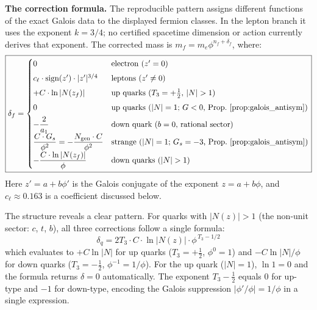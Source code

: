 \documentclass[12pt,a4paper]{article}
\theoremstyle{definition}
\begin{document}
\textbf{The correction formula.}  The reproducible pattern assigns different
functions of the exact Galois data to the displayed fermion classes.  In the
lepton branch it uses the exponent $k=3/4$; no certified spacetime dimension
or action currently derives that exponent.  The corrected mass is
$m_f=m_e\phi^{n_f+\delta_f}$, where:
\begin{equation}
\boxed{\delta_f = \begin{cases}
0 & \text{electron (}z' = 0\text{)} \\[4pt]
c_\ell \cdot \mathrm{sign}(z') \cdot |z'|^{3/4} & \text{leptons (}z' \neq 0\text{)} \\[4pt]
+C \cdot \ln|N(z_f)| & \text{up quarks (}T_3 = +\tfrac{1}{2}\text{, } |N| > 1\text{)} \\[4pt]
0 & \text{up quarks (}|N| = 1\text{; }G < 0\text{, Prop.~\ref{prop:galois_antisym})} \\[4pt]
-\dfrac{2}{a_1} & \text{down quark (}b = 0\text{, rational sector)} \\[4pt]
\dfrac{C \cdot G_s}{\phi^2} = -\dfrac{N_{\text{gen}} \cdot C}{\phi^2} & \text{strange (}|N| = 1\text{; }G_s = -3\text{, Prop.~\ref{prop:galois_antisym})} \\[4pt]
-\dfrac{C \cdot \ln|N(z_f)|}{\phi} & \text{down quarks (}|N| > 1\text{)}
\end{cases}}
\label{eq:normlog}
\end{equation}
Here $z' = a + b\phi'$ is the Galois conjugate of the exponent $z = a + b\phi$, and $c_\ell \approx 0.163$ is a coefficient discussed below.

The structure reveals a clear pattern.  For quarks with $|N(z)| > 1$ (the non-unit sector: $c$, $t$, $b$), all three corrections follow a single formula:
\begin{equation}
\boxed{\delta_q = 2T_3 \cdot C \cdot \ln|N(z)| \cdot \phi^{\,T_3 - 1/2}}
\label{eq:unified_quark}
\end{equation}
which evaluates to $+C\ln|N|$ for up quarks ($T_3 = +\tfrac{1}{2}$, $\phi^0 = 1$) and $-C\ln|N|/\phi$ for down quarks ($T_3 = -\tfrac{1}{2}$, $\phi^{-1} = 1/\phi$).  For the up quark ($|N| = 1$), $\ln 1 = 0$ and the formula returns $\delta = 0$ automatically.  The exponent $T_3 - \tfrac{1}{2}$ equals $0$ for up-type and $-1$ for down-type, encoding the Galois suppression $|\phi'/\phi| = 1/\phi$ in a single expression.
\end{document}
